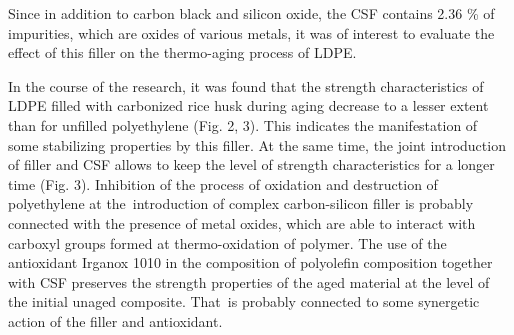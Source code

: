 \begin{multicols}{2}
Since in addition to carbon black and silicon oxide, the CSF contains
2.36 \% of impurities, which are oxides of various metals, it was of
interest to evaluate the effect of this filler on the thermo-aging
process of LDPE.

In the course of the research, it was found that the strength
characteristics of LDPE filled with carbonized rice husk during aging
decrease to a lesser extent than for unfilled polyethylene (Fig. 2, 3).
This indicates the manifestation of some stabilizing properties by this
filler. At the same time, the joint introduction of filler and CSF
allows to keep the level of strength characteristics for a longer time
(Fig. 3). Inhibition of the process of oxidation and destruction of
polyethylene at the~introduction of complex carbon-silicon filler is
probably connected with the presence of metal oxides, which are able to
interact with carboxyl groups formed at thermo-oxidation of polymer. The
use of the antioxidant Irganox 1010 in the composition of polyolefin
composition together with CSF preserves the strength properties of the
aged material at the level of the initial unaged composite. That~is
probably connected to some synergetic action of the filler and
antioxidant.
\end{multicols}

